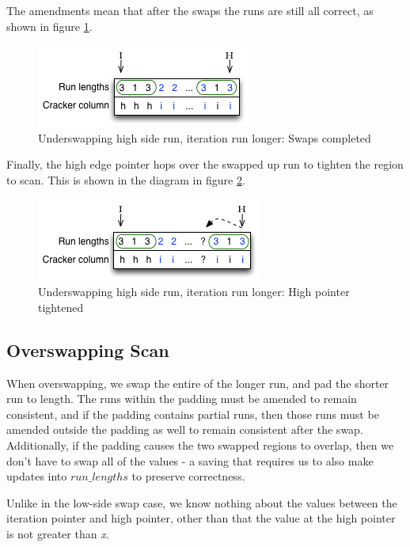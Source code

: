 The amendments mean that after the swaps the runs are still all correct, as shown in figure \ref{fig:underswapping_2c}.

\begin{figure}[H]
  \centering
  \includegraphics[]{images/d19_underswapping_2c}
  \caption{Underswapping high side run, iteration run longer: Swaps completed}
  \label{fig:underswapping_2c}
\end{figure}

Finally, the high edge pointer hops over the swapped up run to tighten the region to scan. This is shown in the diagram in figure \ref{fig:underswapping_2d}.

\begin{figure}[H]
  \centering
  \includegraphics[]{images/d19_underswapping_2d}
  \caption{Underswapping high side run, iteration run longer: High pointer tightened}
  \label{fig:underswapping_2d}
\end{figure}

\subsection{Overswapping Scan}

When overswapping, we swap the entire of the longer run, and pad the shorter run to length. The runs within the padding must be amended to remain consistent, and if the padding contains partial runs, then those runs must be amended outside the padding as well to remain consistent after the swap. Additionally, if the padding causes the two swapped regions to overlap, then we don't have to swap all of the values - a saving that requires us to also make updates into $run\_lengths$ to preserve correctness.

Unlike in the low-side swap case, we know nothing about the values between the iteration pointer and high pointer, other than that the value at the high pointer is not greater than \textit{x}.

